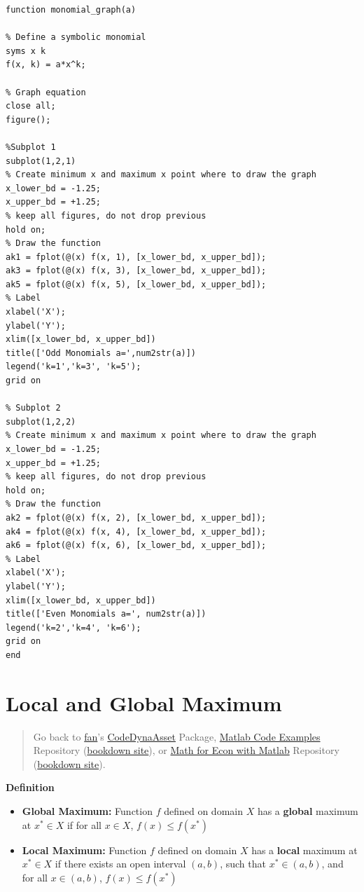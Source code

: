 \documentclass[
]{book}
\begin{document}
\begin{verbatim}
function monomial_graph(a)

% Define a symbolic monomial
syms x k
f(x, k) = a*x^k;

% Graph equation
close all;
figure();

%Subplot 1
subplot(1,2,1)
% Create minimum x and maximum x point where to draw the graph
x_lower_bd = -1.25;
x_upper_bd = +1.25;
% keep all figures, do not drop previous
hold on;
% Draw the function
ak1 = fplot(@(x) f(x, 1), [x_lower_bd, x_upper_bd]);
ak3 = fplot(@(x) f(x, 3), [x_lower_bd, x_upper_bd]);
ak5 = fplot(@(x) f(x, 5), [x_lower_bd, x_upper_bd]);
% Label
xlabel('X');
ylabel('Y');
xlim([x_lower_bd, x_upper_bd])
title(['Odd Monomials a=',num2str(a)])
legend('k=1','k=3', 'k=5');
grid on

% Subplot 2
subplot(1,2,2)
% Create minimum x and maximum x point where to draw the graph
x_lower_bd = -1.25;
x_upper_bd = +1.25;
% keep all figures, do not drop previous
hold on;
% Draw the function
ak2 = fplot(@(x) f(x, 2), [x_lower_bd, x_upper_bd]);
ak4 = fplot(@(x) f(x, 4), [x_lower_bd, x_upper_bd]);
ak6 = fplot(@(x) f(x, 6), [x_lower_bd, x_upper_bd]);
% Label
xlabel('X');
ylabel('Y');
xlim([x_lower_bd, x_upper_bd])
title(['Even Monomials a=', num2str(a)])
legend('k=2','k=4', 'k=6');
grid on
end
\end{verbatim}

\hypertarget{local-and-global-maximum}{%
\section{Local and Global Maximum}\label{local-and-global-maximum}}

\begin{quote}
Go back to \href{http://fanwangecon.github.io/}{fan}'s \href{https://fanwangecon.github.io/CodeDynaAsset/}{CodeDynaAsset} Package, \href{https://fanwangecon.github.io/M4Econ/}{Matlab Code Examples} Repository (\href{https://fanwangecon.github.io/M4Econ/bookdown}{bookdown site}), or \href{https://fanwangecon.github.io/Math4Econ/}{Math for Econ with Matlab} Repository (\href{https://fanwangecon.github.io/Math4Econ/bookdown}{bookdown site}).
\end{quote}

\textbf{Definition}

\begin{itemize}
\item
  \textbf{Global Maximum:} Function \(f\) defined on domain \(X\) has a
  \textbf{global} maximum at \(x^* \in X\) if for all \(x\in X\),
  \(f(x)\le f(x^* )\)
\item
  \textbf{Local Maximum:} Function \(f\) defined on domain \(X\) has a
  \textbf{local} maximum at \(x^* \in X\) if there exists an open interval
  \(\left(a,b\right)\), such that \(x^* \in \left(a,b\right)\), and for
  all \(x\in \left(a,b\right)\), \(f(x)\le f(x^* )\)
\end{itemize}
\end{document}
